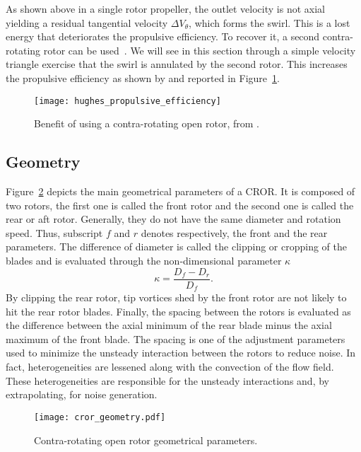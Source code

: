 
As shown above in a single rotor propeller, the outlet velocity is not axial
yielding a residual tangential velocity $\Delta V_{\theta}$,
which forms the swirl. 
This is a lost energy that deteriorates the propulsive efficiency. 
To recover it, a second contra-rotating rotor can be used~\cite{Hager1988}.
We will see in this section through a simple velocity triangle exercise that
the swirl is annulated by the second rotor. This increases the propulsive
efficiency as shown by \citet{Hughes1989} and reported 
in Figure~\ref{fig:hughes_propulsive_efficiency}.
\begin{figure}[htp]
  \centering
  \texttt{[image: hughes\_propulsive\_efficiency]}
  \caption{Benefit of using a contra-rotating open rotor, from \citet{Hughes1989}.}
  \label{fig:hughes_propulsive_efficiency}
\end{figure}

\subsection{Geometry}
\label{sub:cror_geometry}

Figure~\ref{fig:cror_geometry} depicts the main
geometrical parameters of a CROR.
It is composed of two rotors, the first one is called
the front rotor and the second one is called the rear or aft rotor.
Generally, they do not have the same diameter and rotation speed. 
Thus, subscript $f$ and $r$ denotes respectively,
the front and the rear parameters.
The difference of diameter is called the clipping or cropping
of the blades and is evaluated through the non-dimensional parameter
$\kappa$
\begin{equation}
    \kappa = \frac{D_f - D_r}{D_f}.
\end{equation}
By clipping the rear
rotor, tip vortices shed by the front rotor are not likely
to hit the rear rotor blades.
Finally, the spacing between the rotors
is evaluated as the difference between the axial minimum of the
rear blade minus the axial maximum of the front blade. The spacing
is one of the adjustment parameters used to minimize the unsteady
interaction between the rotors to reduce noise. In fact, 
heterogeneities are lessened along with the convection of
the flow field. These heterogeneities are responsible
for the unsteady interactions and, by extrapolating, for noise generation.
\begin{figure}[htp]
  \centering
  \texttt{[image: cror\_geometry.pdf]}
  \caption{Contra-rotating open rotor geometrical parameters.}
  \label{fig:cror_geometry}
\end{figure}

